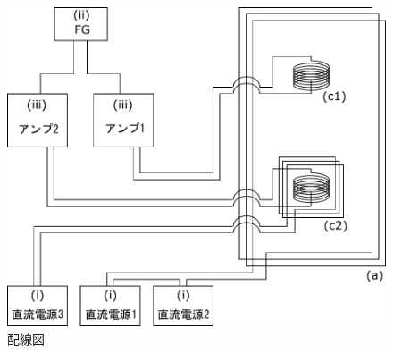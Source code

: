 \vspace{1cm}
\begin{figure}[h]
\centering
\includegraphics[width=12cm]{resonance/whatwhyhow/kairozu.pdf}
\caption{配線図}
\end{figure}

\clearpage
